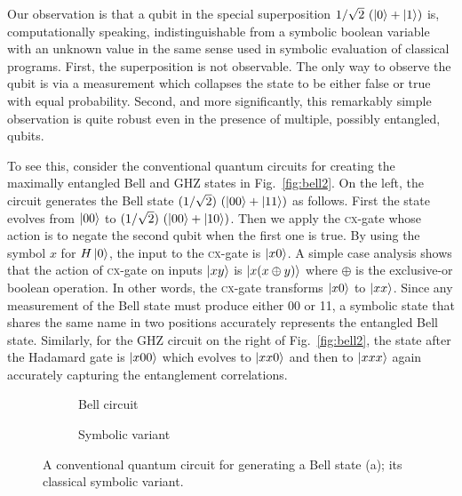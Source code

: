 \documentclass[sigplan,review]{acmart}
\newcommand{\cx}{\textsc{cx}}
\begin{document}
Our observation is that a qubit in the special superposition
$1/\sqrt{2} ~(\ket{0} + \ket{1} )$ is, computationally speaking,
indistinguishable from a symbolic boolean variable with an unknown
value in the same sense used in symbolic evaluation of classical
programs. First, the superposition is not observable. The only way to
observe the qubit is via a measurement which collapses the state to be
either false or true with equal probability. Second, and more
significantly, this remarkably simple observation is quite robust even
in the presence of multiple, possibly entangled, qubits.

To see this, consider the conventional quantum circuits for creating
the maximally entangled Bell and GHZ states in
Fig.~\ref{fig:bell2}. On the left, the circuit generates the Bell
state $(1/\sqrt{2})~ (\ket{00} + \ket{11})$ as follows. First the state
evolves from $\ket{00}$ to $(1/\sqrt{2})~ (\ket{00} + \ket{10})$. Then
we apply the \cx-gate whose action is to negate the second qubit when
the first one is true. By using the symbol $x$ for $H\ket{0}$, the
input to the \cx-gate is $\ket{x0}$. A simple case analysis shows that
the action of \cx-gate on inputs $\ket{xy}$ is $\ket{x(x \oplus y)}$
where $\oplus$ is the exclusive-or boolean operation. In other words,
the \cx-gate transforms $\ket{x0}$ to $\ket{xx}$. Since any
measurement of the Bell state must produce either 00 or 11, 
a symbolic state that shares the same name in two positions
accurately represents the entangled Bell state. Similarly,
for the GHZ circuit on the right of Fig.~\ref{fig:bell2}, the state
after the Hadamard gate is $\ket{x00}$ which evolves to $\ket{xx0}$
and then to $\ket{xxx}$ again accurately capturing the entanglement
correlations.

\begin{figure*}[t]
  \centering
\begin{subfigure}[b]{.25\textwidth}
    \centering
\caption{\label{fig:bellqcore}Bell circuit}
\end{subfigure}
\qquad\qquad
\begin{subfigure}[b]{.25\textwidth}
    \centering
\caption{\label{fig:bellccore}Symbolic variant}
\end{subfigure}
\caption{\label{fig:bellall}A conventional quantum circuit for
  generating a Bell state (a); its classical symbolic variant.}
\end{figure*}
\end{document}

